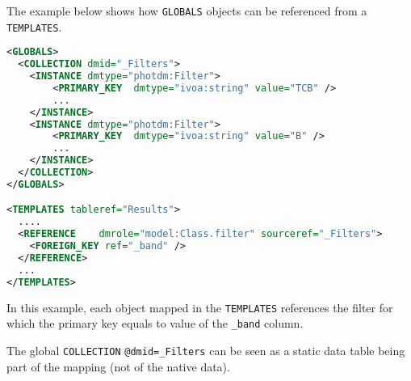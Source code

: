 The example below shows how \texttt{GLOBALS} objects can be referenced from a  \texttt{TEMPLATES}. 

\begin{lstlisting}[caption={Dynamic reference example},language=XML]
<GLOBALS>
  <COLLECTION dmid="_Filters">
    <INSTANCE dmtype="photdm:Filter">
		<PRIMARY_KEY  dmtype="ivoa:string" value="TCB" />
		...
	</INSTANCE>
	<INSTANCE dmtype="photdm:Filter">
		<PRIMARY_KEY  dmtype="ivoa:string" value="B" />
		...
	</INSTANCE>
  </COLLECTION>
</GLOBALS>

<TEMPLATES tableref="Results">
  ....
  <REFERENCE	dmrole="model:Class.filter"	sourceref="_Filters">
    <FOREIGN_KEY ref="_band" />
  </REFERENCE>
  ...
</TEMPLATES>

\end{lstlisting}  

In this example, each object mapped in the \texttt{TEMPLATES} references the filter for which the primary key equals to value of the \texttt{\_band} column.

The global \texttt{COLLECTION} \texttt{@dmid=\_Filters} can be seen as a static data table being part of the mapping (not of the native data).

